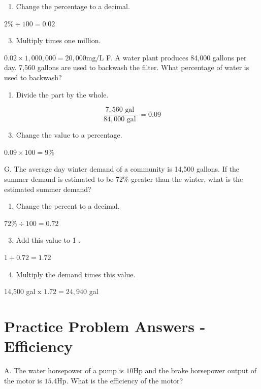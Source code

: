 \documentclass[10pt]{article}
\begin{document}
\begin{enumerate}
  \item Change the percentage to a decimal.
\end{enumerate}
$2 \% \div 100=0.02$

\begin{enumerate}
  \setcounter{enumi}{2}
  \item Multiply times one million.
\end{enumerate}
$0.02 \times 1,000,000=20,000 \mathrm{mg} / \mathrm{L}$ F. A water plant produces 84,000 gallons per day. 7,560 gallons are used to backwash the filter. What percentage of water is used to backwash?

\begin{enumerate}
  \item Divide the part by the whole.
\end{enumerate}
$$
\frac{7,560 \text { gal }}{84,000 \text { gal }}=0.09
$$

\begin{enumerate}
  \setcounter{enumi}{2}
  \item Change the value to a percentage.
\end{enumerate}
$0.09 \times 100=9 \%$

G. The average day winter demand of a community is 14,500 gallons. If the summer demand is estimated to be $72 \%$ greater than the winter, what is the estimated summer demand?

\begin{enumerate}
  \item Change the percent to a decimal.
\end{enumerate}
$72 \% \div 100=0.72$

\begin{enumerate}
  \setcounter{enumi}{2}
  \item Add this value to 1 .
\end{enumerate}
$1+0.72=1.72$

\begin{enumerate}
  \setcounter{enumi}{3}
  \item Multiply the demand times this value.
\end{enumerate}
14,500 gal x $1.72=24,940$ gal

\section{Practice Problem Answers - Efficiency}
A. The water horsepower of a pump is $10 \mathrm{Hp}$ and the brake horsepower output of the motor is $15.4 \mathrm{Hp}$. What is the efficiency of the motor?
\end{document}
